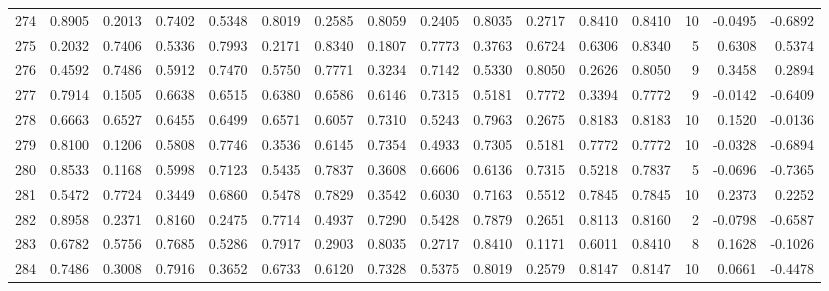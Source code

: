 \begin{tabular}{lrrrrrrrrrrrrrrr}
274 &      0.8905 &  0.2013 &  0.7402 &  0.5348 &  0.8019 &  0.2585 &  0.8059 &  0.2405 &  0.8035 &  0.2717 &   0.8410 &     0.8410 &     10 &                   -0.0495 &                    -0.6892 \\
275 &      0.2032 &  0.7406 &  0.5336 &  0.7993 &  0.2171 &  0.8340 &  0.1807 &  0.7773 &  0.3763 &  0.6724 &   0.6306 &     0.8340 &      5 &                    0.6308 &                     0.5374 \\
276 &      0.4592 &  0.7486 &  0.5912 &  0.7470 &  0.5750 &  0.7771 &  0.3234 &  0.7142 &  0.5330 &  0.8050 &   0.2626 &     0.8050 &      9 &                    0.3458 &                     0.2894 \\
277 &      0.7914 &  0.1505 &  0.6638 &  0.6515 &  0.6380 &  0.6586 &  0.6146 &  0.7315 &  0.5181 &  0.7772 &   0.3394 &     0.7772 &      9 &                   -0.0142 &                    -0.6409 \\
278 &      0.6663 &  0.6527 &  0.6455 &  0.6499 &  0.6571 &  0.6057 &  0.7310 &  0.5243 &  0.7963 &  0.2675 &   0.8183 &     0.8183 &     10 &                    0.1520 &                    -0.0136 \\
279 &      0.8100 &  0.1206 &  0.5808 &  0.7746 &  0.3536 &  0.6145 &  0.7354 &  0.4933 &  0.7305 &  0.5181 &   0.7772 &     0.7772 &     10 &                   -0.0328 &                    -0.6894 \\
280 &      0.8533 &  0.1168 &  0.5998 &  0.7123 &  0.5435 &  0.7837 &  0.3608 &  0.6606 &  0.6136 &  0.7315 &   0.5218 &     0.7837 &      5 &                   -0.0696 &                    -0.7365 \\
281 &      0.5472 &  0.7724 &  0.3449 &  0.6860 &  0.5478 &  0.7829 &  0.3542 &  0.6030 &  0.7163 &  0.5512 &   0.7845 &     0.7845 &     10 &                    0.2373 &                     0.2252 \\
282 &      0.8958 &  0.2371 &  0.8160 &  0.2475 &  0.7714 &  0.4937 &  0.7290 &  0.5428 &  0.7879 &  0.2651 &   0.8113 &     0.8160 &      2 &                   -0.0798 &                    -0.6587 \\
283 &      0.6782 &  0.5756 &  0.7685 &  0.5286 &  0.7917 &  0.2903 &  0.8035 &  0.2717 &  0.8410 &  0.1171 &   0.6011 &     0.8410 &      8 &                    0.1628 &                    -0.1026 \\
284 &      0.7486 &  0.3008 &  0.7916 &  0.3652 &  0.6733 &  0.6120 &  0.7328 &  0.5375 &  0.8019 &  0.2579 &   0.8147 &     0.8147 &     10 &                    0.0661 &                    -0.4478 \\

\end{tabular}
